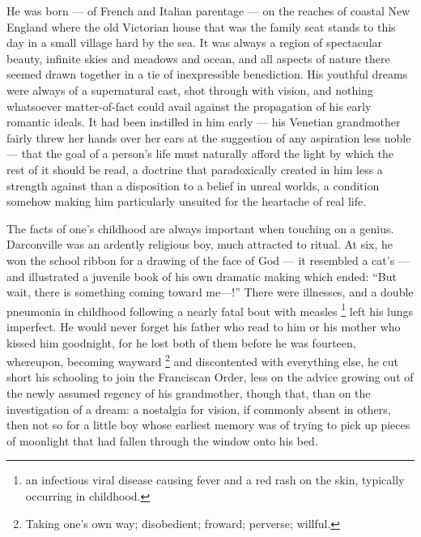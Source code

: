   He was born --- of French and Italian parentage --- on the reaches of coastal New
England where the old Victorian house that was the family seat stands to this
day in a small village hard by the sea. It was always a region of spectacular
beauty, infinite skies and meadows and ocean, and all aspects of nature there
seemed drawn together in a tie of inexpressible benediction. His youthful dreams
were always of a supernatural cast, shot through with vision, and nothing
whatsoever matter-of-fact could avail against the propagation of his early
romantic ideals. It had been instilled in him early --- his Venetian grandmother
fairly threw her hands over her ears at the suggestion of any aspiration less
noble --- that the goal of a person’s life must naturally afford the light by which
the rest of it should be read, a doctrine that paradoxically created in him less
a strength against than a disposition to a belief in unreal worlds, a condition
somehow making him particularly unsuited for the heartache of real life.

  The facts of one’s childhood are always important when touching on a genius.
Darconville was an ardently religious boy, much attracted to ritual. At six, he
won the school ribbon for a drawing of the face of God --- it resembled a cat’s
--- and illustrated a juvenile book of his own dramatic making which ended: 
“But wait, there is something coming toward me—!” There were illnesses, and a double
pneumonia in childhood following a nearly fatal bout with measles 
\footnote{an infectious viral disease causing fever and a red rash on the skin,
typically occurring in childhood.}
left his lungs imperfect. He would never forget his father who read to him or his mother who
kissed him goodnight, for he lost both of them before he was fourteen,
whereupon, becoming wayward 
\footnote{Taking one's own way; disobedient; froward; perverse; willful.}
and discontented with everything else, he cut short
his schooling to join the Franciscan Order, less on the advice growing out of
the newly assumed regency of his grandmother, though that, than on the
investigation of a dream: a nostalgia for vision, if commonly absent in others,
then not so for a little boy whose earliest memory was of trying to pick up
pieces of moonlight that had fallen through the window onto his bed.

